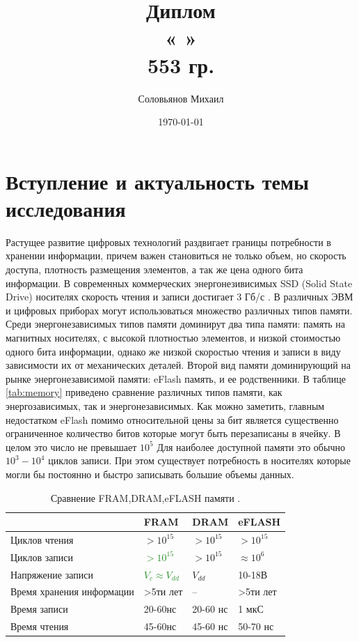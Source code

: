 \documentclass[a4paper,12pt]{article} %
\author{Соловьянов Михаил}
\title{Диплом \\ \LARGE{« 
»\\ 553 гр.}}
\date{\today}
\begin{document}

\tableofcontents
{}
\newpage



\section{Вступление и актуальность темы исследования}

Растущее развитие цифровых технологий раздвигает границы потребности в хранении информации, причем важен становиться не только объем, но скорость доступа, плотность размещения элементов, а так же цена одного бита информации. В современных коммерческих энергонезивисимых  SSD (Solid State Drive) носителях скорость чтения и записи достигает 3 Гб/с \cite{ssd}.   В различных ЭВМ и цифровых приборах могут использоваться множество различных типов памяти. Среди энергонезависимых типов памяти доминирут два типа памяти: память на магнитных носителях, с высокой плотностью элементов, и низкой стоимостью одного бита информации, однако же низкой скоростью чтения и записи в виду зависимости их от механических деталей. Второй вид памяти доминирующий на рынке энергонезависимой памяти: eFlash память, и ее родственники. В таблице  \eqref{tab:memory} приведено сравнение различных типов памяти, как энергозависимых, так и энергонезависимых. Как можно заметить, главным недостатком eFlash помимо относительной цены за бит является существенно ограниченное количество битов которые могут быть перезаписаны в ячейку. В целом это число не превышает $10^5 $ Для наиболее доступной памяти это обычно $ 10^3-10^4  $ циклов записи. При этом существует потребность в носителях которые могли бы постоянно и быстро записывать большие объемы данных. 

\begin{table}[h]
\centering
\begin{tabular}{|l|l|l|l|}
\hline
                          & FRAM            & DRAM       & eFLASH     \\ \hline
Циклов чтения             & $>10^{15}$      & $>10^{15}$ & $>10^{15}$ \\ \hline
Циклов записи             &  \textcolor{ForestGreen}{$>10^{15}$}      & $>10^{15}$ &\textcolor{BrickRed} {$\approx 10^6$}    \\ \hline
Напряжение записи         & \textcolor{ForestGreen}{$V_c \approx V_{dd} $} & $V_{dd} $  &\textcolor{BrickRed}{ 10-18В }    \\ \hline
Время хранения информации & >5ти лет        & --         &>5ти лет   \\ \hline
Время записи              & 20-60нс         & 20-60 нс   & 1 мкС      \\ \hline
Время чтения              & 45-60нс         & 45-60 нс   & 50-70 нс   \\ \hline
\end{tabular}
\caption{Сравнение FRAM,DRAM,eFLASH памяти \cite{FRAM}.}
\label{tab:memory}
\end{table}
\end{document}
